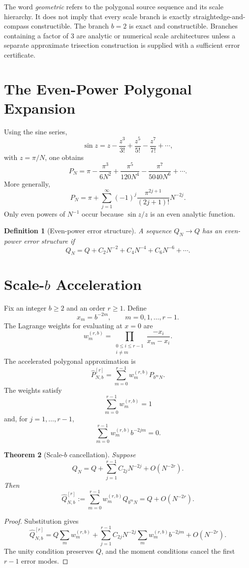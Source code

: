 \documentclass[11pt]{article}
\newtheorem{theorem}{Theorem}[section]
\newtheorem{definition}[theorem]{Definition}
\theoremstyle{remark}
\newcommand{\Pacc}{\widehat P}
\begin{document}
The word \emph{geometric} refers to the polygonal source sequence and its
scale hierarchy.  It does not imply that every scale branch is exactly
straightedge-and-compass constructible.  The branch $b=2$ is exact and
constructible.  Branches containing a factor of $3$ are analytic or numerical
scale architectures unless a separate approximate trisection construction is
supplied with a sufficient error certificate.

\section{The Even-Power Polygonal Expansion}

Using the sine series,
\[
  \sin z=z-\frac{z^3}{3!}+\frac{z^5}{5!}-\frac{z^7}{7!}+\cdots,
\]
with $z=\pi/N$, one obtains
\[
  P_N
  =\pi-\frac{\pi^3}{6N^2}
  +\frac{\pi^5}{120N^4}
  -\frac{\pi^7}{5040N^6}+\cdots.
\]
More generally,
\[
  P_N
  =\pi+\sum_{j=1}^{\infty}
  (-1)^j\frac{\pi^{2j+1}}{(2j+1)!}N^{-2j}.
\]
Only even powers of $N^{-1}$ occur because $\sin z/z$ is an even analytic
function.

\begin{definition}[Even-power error structure]
A sequence $Q_N\to Q$ has an even-power error structure if
\[
  Q_N=Q+C_2N^{-2}+C_4N^{-4}+C_6N^{-6}+\cdots.
\]
\end{definition}

\section{Scale-$b$ Acceleration}

Fix an integer $b\ge2$ and an order $r\ge1$.  Define
\[
  x_m=b^{-2m},\qquad m=0,1,\ldots,r-1.
\]
The Lagrange weights for evaluating at $x=0$ are
\[
  w_m^{(r,b)}
  =\prod_{\substack{0\le i\le r-1\\ i\ne m}}
  \frac{-x_i}{x_m-x_i}.
\]
The accelerated polygonal approximation is
\[
  \Pacc^{[r]}_{N,b}
  =\sum_{m=0}^{r-1}w_m^{(r,b)}P_{b^mN}.
\]
The weights satisfy
\[
  \sum_{m=0}^{r-1}w_m^{(r,b)}=1
\]
and, for $j=1,\ldots,r-1$,
\[
  \sum_{m=0}^{r-1}w_m^{(r,b)}b^{-2jm}=0.
\]

\begin{theorem}[Scale-$b$ cancellation]
Suppose
\[
  Q_N=Q+\sum_{j=1}^{r-1}C_{2j}N^{-2j}+O(N^{-2r}).
\]
Then
\[
  \widehat Q^{[r]}_{N,b}
  :=\sum_{m=0}^{r-1}w_m^{(r,b)}Q_{b^mN}
  =Q+O(N^{-2r}).
\]
\end{theorem}

\begin{proof}
Substitution gives
\[
\widehat Q^{[r]}_{N,b}
=Q\sum_mw_m^{(r,b)}
+\sum_{j=1}^{r-1}C_{2j}N^{-2j}
 \sum_mw_m^{(r,b)}b^{-2jm}
+O(N^{-2r}).
\]
The unity condition preserves $Q$, and the moment conditions cancel the first
$r-1$ error modes.
\end{proof}
\end{document}
